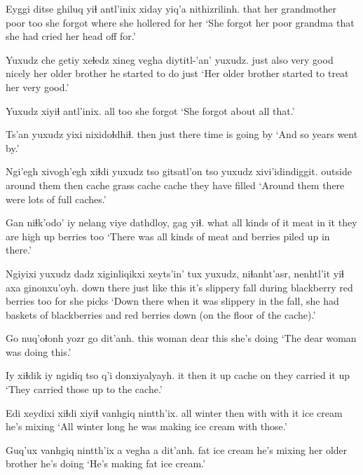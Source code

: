 \documentclass[12pt]{article}
\begin{document}
\gll Eyggi ditse           ghiluq yiɬ antl'inix  xiday   {yiq'a nithizrilinh.}
that  {her grandmother} poor   too {she forgot} where  {she hollered for her}
\glt `She forgot her poor grandma that she had cried her head off for.'
\glend

\gll Yuxudz che getiy xeɬedz xineg vegha              diytitl-'an'     yuxudz.
just    also   very  good   nicely {her older brother} {he started to do} just
\glt `Her older brother started to treat her very good.'
\glend

\gll Yuxudz  xiyiɬ antl'inix.
all      too {she forgot}
\glt `She forgot about all that.'
\glend

\gll Ts'an yuxudz yixi  nixidoɬdhiɬ.
then  just      there {time is going by}
\glt `And so years went by.'
\glend

\gll Ngi'egh xivogh'egh xiɬdi yuxudz tso gitsatl'on  tso   yuxudz xivi'idindiggit.
outside {around them} then {} cache {grass cache} cache   {they have filled}
\glt `Around them there were lots of full caches.'
\glend

\gll Gan  niɬk'odo'     iy nelang viye  dathdloy,        gag     yiɬ.
what {all kinds of} it meat   {in it} {they are high up} berries too
\glt `There was all kinds of meat and berries piled up in there.'
\glend

\gll Ngiyixi    yuxudz dadz      xiginliqikxi xeyts'in' tux yuxudz, niɬanht'asr, nenhtl'it   yiɬ axa  ginonxu'oyh.
{down there} just   {like this} {it's slippery} fall  during {} blackberry  {red berries} too for {she picks}
\glt `Down there when it was slippery in the fall, she had baskets of blackberries and red berries down (on the floor of the cache).'
\glend

\gll Go   nuq'oɬonh yozr go dit'anh.
this woman     dear this {she's doing}
\glt `The dear woman was doing this.'
\glend

\gll Iy xiɬdik iy ngidiq tso q'i donxiyalyayh.
it then   it up     cache on  {they carried it up}
\glt `They carried those up to the cache.'
\glend

\gll Edi xeydixi xiɬdi xiyiɬ vanhgiq   nintth'ix.
all winter then  with {with it}  {ice cream} {he's mixing}
\glt `All winter long he was making ice cream with those.'
\glend

\gll Guq'ux vanhgiq   nintth'ix   a vegha             a dit'anh.
fat    {ice cream} {he's mixing} {}  {her older brother} {}  {he's doing}
\glt `He's making fat ice cream.'
\glend
\end{document}
